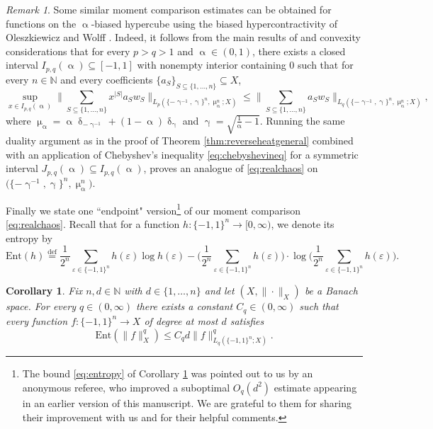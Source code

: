 \documentclass[11pt,reqno]{amsart}
\renewcommand{\leq}{\leqslant}
\renewcommand{\gamma}{\upgamma}
\newcommand{\e}{\varepsilon}
\newcommand{\1}{\mathbf 1}
\newtheorem{corollary}[theorem]{Corollary}
\theoremstyle{remark}
\newtheorem{remark}[theorem]{Remark}
\renewcommand{\subset}{\subseteq}
\newcommand{\N}{\mathbb N}
\newcommand{\eqdef}{\stackrel{\mathrm{def}}{=}}
\renewcommand{\gamma}{\upgamma}
\renewcommand{\alpha}{\upalpha}
\renewcommand{\delta}{\updelta}
\renewcommand{\mu}{\upmu}
\begin{document}
\begin{remark}
Some similar moment comparison estimates can be obtained for functions on the $\alpha$-biased hypercube using the biased hypercontractivity of Oleszkiewicz \cite{Ole03} and Wolff \cite{Wol07}. Indeed, it follows from the main results of \cite{Ole03, Wol07} and convexity considerations that for every $p>q>1$ and $\alpha\in(0,1)$, there exists a closed interval $I_{p,q}(\alpha) \subseteq[-1,1]$ with nonempty interior containing 0  such that for every $n\in\N$ and every coefficients $\{a_S\}_{S\subseteq\{1,\ldots,n\}}\subset X$,
\begin{equation}
\sup_{x\in I_{p,q}(\alpha)} \Big\| \sum_{S\subseteq\{1,\ldots,n\}} x^{|S|} a_S w_S \Big\|_{L_p(\{-\gamma^{-1},\gamma\}^n, \mu_\alpha^n ;X)} \leq \Big\| \sum_{S\subseteq\{1,\ldots,n\}} a_S w_S \Big\|_{L_q(\{-\gamma^{-1},\gamma\}^n, \mu_\alpha^n ;X)},
\end{equation}
where $\mu_\alpha = \alpha \delta_{-\gamma^{-1}} + (1-\alpha) \delta_\gamma$ and $\gamma = \sqrt{\tfrac{1}{\alpha}-1}$. Running the same duality argument as in the proof of Theorem \ref{thm:reverseheatgeneral} combined with an application of Chebyshev's inequality \eqref{eq:chebyshevineq} for a symmetric interval $J_{p,q}(\alpha) \subseteq I_{p,q}(\alpha)$, proves an analogue of \eqref{eq:realchaos} on $\big(\{-\gamma^{-1},\gamma\}^n, \mu_\alpha^n\big)$.
\end{remark}

Finally we state one ``endpoint" version\footnote{The bound \eqref{eq:entropy} of Corollary \ref{cor:entropy} was pointed out to us by an anonymous referee, who improved a suboptimal $O_q(d^2)$ estimate appearing in an earlier version of this manuscript. We are grateful to them for sharing their improvement with us and for their helpful comments.} of our moment comparison \eqref{eq:realchaos}. Recall that for a function $h:\{-1,1\}^n\to[0,\infty)$, we denote its entropy by
\begin{equation}
\mathrm{Ent}(h) \eqdef \frac{1}{2^n}\sum_{\e\in\{-1,1\}^n} h(\e)\log h(\e)- \Big(\frac{1}{2^n}\sum_{\e\in\{-1,1\}^n} h(\e)\Big) \cdot \log\Big(\frac{1}{2^n}\sum_{\e\in\{-1,1\}^n}h(\e)\Big).
\end{equation}

\begin{corollary} \label{cor:entropy}
Fix $n,d\in\N$ with $d\in\{1,\ldots,n\}$ and let $(X,\|\cdot\|_X)$ be a Banach space. For every $q\in(0,\infty)$ there exists a constant $C_q\in(0,\infty)$ such that every function $f:\{-1,1\}^n\to X$ of degree at most $d$ satisfies
\begin{equation} \label{eq:entropy}
\mathrm{Ent}( \|f\|_X^q) \leq C_qd \|f\|_{L_q(\{-1,1\}^n;X)}^q.
\end{equation}
\end{corollary}
\end{document}

